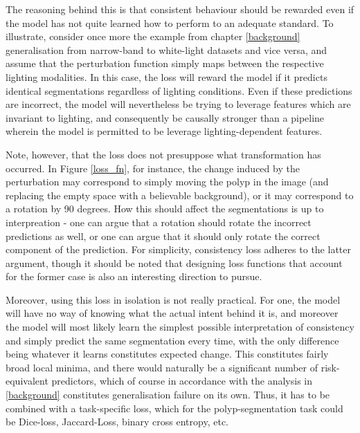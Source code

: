     The reasoning behind this is that consistent behaviour should be rewarded even if the model has not quite learned how to perform to an adequate standard. To illustrate, consider once more the example from chapter \ref{background} generalisation from narrow-band to white-light datasets and vice versa, and assume that the perturbation function simply maps between the respective lighting modalities. In this case, the loss will reward the model if it predicts identical segmentations regardless of lighting conditions. Even if these predictions are incorrect, the model will nevertheless be trying to leverage features which are invariant to lighting, and consequently be causally stronger than a pipeline wherein the model is permitted to be leverage lighting-dependent features. 

    Note, however, that the loss does not presuppose what transformation has occurred. In Figure \ref{loss_fn}, for instance, the change induced by the perturbation may correspond to simply moving the polyp in the image (and replacing the empty space with a believable background), or it may correspond to a rotation by 90 degrees. How this should affect the segmentations is up to interpreation - one can argue that a rotation should rotate the incorrect predictions as well, or one can argue that it should only rotate the correct component of the prediction. For simplicity, consistency loss adheres to the latter argument, though it should be noted that designing loss functions that account for the former case is also an interesting direction to pursue. 
	
	Moreover, using this loss in isolation is not really practical. For one, the model will have no way of knowing what the actual intent behind it is, and moreover the model will most likely learn the simplest possible interpretation of consistency and simply predict the same segmentation every time, with the only difference being whatever it learns constitutes expected change. This constitutes fairly broad local minima, and there would naturally be a significant number of risk-equivalent predictors, which of course in accordance with the analysis in \ref{background} constitutes generalisation failure on its own. Thus, it has to be combined with a task-specific loss, which for the polyp-segmentation task could be Dice-loss, Jaccard-Loss, binary cross entropy, etc. 
	

